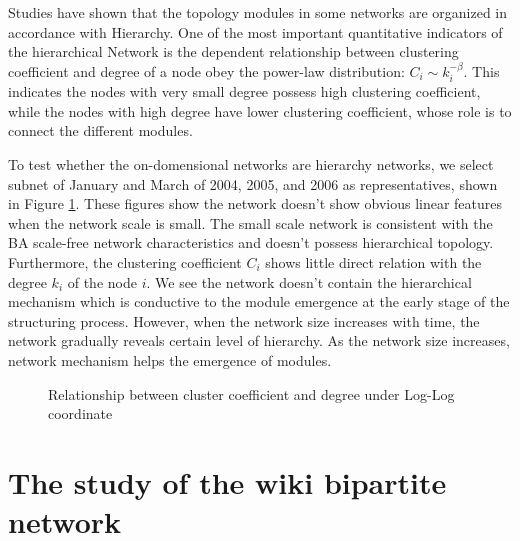 \documentclass{elsarticle}
\begin{document}
Studies have shown that the topology modules in some networks are
organized in accordance with Hierarchy\cite{PhysRevE.67.026112,PhysRevE.65.066122}. One of the most
important quantitative indicators of the hierarchical Network is the
dependent relationship between clustering coefficient and degree of a
node obey
the power-law distribution: $C_i\sim k_i^{-\beta}$. This indicates the
nodes with very small degree possess high clustering coefficient,
while the nodes with high degree have lower clustering coefficient, whose role is to connect the different modules.

To test whether the on-domensional networks are hierarchy networks, we select subnet of  January and
March of 2004, 2005, and 2006  as representatives, shown in
Figure \ref{fig:hierarchy}. These figures show the  network doesn’t show obvious
linear features when the network scale is small. The small scale network is consistent with the
BA scale-free network characteristics and doesn’t possess hierarchical
topology. Furthermore, the clustering coefficient $C_i$
shows little direct relation with the degree $k_i$ of the node $i$. We see the  network doesn’t contain the
hierarchical mechanism which is conductive to the module emergence at
the early stage of the structuring process. However, when the network
size increases with time, the network gradually reveals certain level
of hierarchy. As the
network size increases, network mechanism helps the emergence of
modules. 


\begin{figure}[htpb]
  \centering
  \subfigure[ ]{
     \scalebox{0.18}{\texttt{[image: 05-1]}}
   } \quad
  \subfigure[ ]{ 
       \scalebox{0.18}{\texttt{[image: 05-2]}}
   } 
  
    \subfigure[ ]{
     \scalebox{0.18}{\texttt{[image: 05-3]}}
   } \quad
  \subfigure[ ]{ 
       \scalebox{0.18}{\texttt{[image: 05-4]}}
   } 
   
    \subfigure[ ]{
     \scalebox{0.18}{\texttt{[image: 05-5]}}
   } \quad
  \subfigure[ ]{ 
       \scalebox{0.18}{\texttt{[image: 05-6]}}
   } 
   \caption{Relationship between cluster coefficient and degree under
     Log-Log coordinate}
   \label{fig:hierarchy}
\end{figure}

\section{The  study of the wiki bipartite network}
\label{sec:4the-pilot-study}
\end{document}
